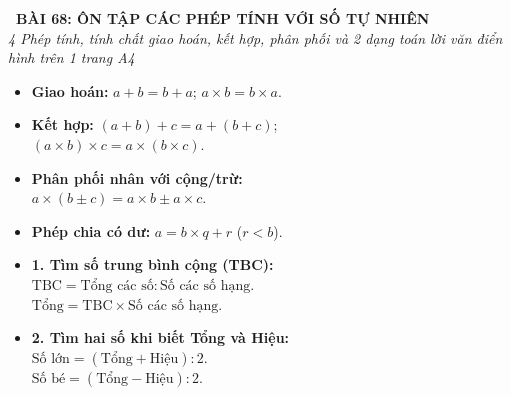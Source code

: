 \documentclass[14pt,a4paper,oneside]{extbook}
\begin{document}
\noindent
\begin{tcolorbox}[
  enhanced,
  colback=teal!8!white,
  colframe=teal!80!black,
  arc=3mm, boxrule=1pt,
  left=3mm, right=3mm, top=2mm, bottom=2mm,
  halign=center
]
  {\Large\bfseries\color{teal!90!black}\faBookmark\ BÀI 68: ÔN TẬP CÁC PHÉP TÍNH VỚI SỐ TỰ NHIÊN}\\[1.5pt]
  {\footnotesize\itshape\color{black!75} 4 Phép tính, tính chất giao hoán, kết hợp, phân phối và 2 dạng toán lời văn điển hình trên 1 trang A4}
\end{tcolorbox}

\vspace{-2.5mm}

\noindent
\begin{minipage}[t]{0.49\textwidth}\vspace{0pt}
\begin{tcolorbox}[
  enhanced,
  colback=blue!4!white,
  colframe=blue!75!black,
  arc=2mm, boxrule=0.8pt,
  left=2mm, right=2mm, top=1.8mm, bottom=1.8mm,
  title={\footnotesize\bfseries\color{white}\faCogs\ 1. Tính chất các phép tính}
]
{\footnotesize
\begin{itemize}\setlength{\itemsep}{1pt}\setlength{\leftskip}{-2.5mm}
  \item \textbf{Giao hoán:} $a + b = b + a$; \quad $a \times b = b \times a$.
  \item \textbf{Kết hợp:} $(a+b)+c = a+(b+c)$;\\
  $(a \times b) \times c = a \times (b \times c)$.
  \item \textbf{Phân phối nhân với cộng/trừ:}\\
  $a \times (b \pm c) = a \times b \pm a \times c$.
  \item \textbf{Phép chia có dư:} $a = b \times q + r$ ($r < b$).
\end{itemize}
}
\end{tcolorbox}
\end{minipage}
\hfill
\begin{minipage}[t]{0.49\textwidth}\vspace{0pt}
\begin{tcolorbox}[
  enhanced,
  colback=teal!4!white,
  colframe=teal!75!black,
  arc=2mm, boxrule=0.8pt,
  left=2mm, right=2mm, top=1.8mm, bottom=1.8mm,
  title={\footnotesize\bfseries\color{white}\faBook\ 2. Hai dạng toán lời văn kinh điển}
]
{\footnotesize
\begin{itemize}\setlength{\itemsep}{1.5pt}\setlength{\leftskip}{-2.5mm}
  \item \textbf{1. Tìm số trung bình cộng (TBC):}\\
  $\text{TBC} = \text{Tổng các số} : \text{Số các số hạng}$.\\
  $\text{Tổng} = \text{TBC} \times \text{Số các số hạng}$.
  \item \textbf{2. Tìm hai số khi biết Tổng và Hiệu:}\\
  $\text{Số lớn} = (\text{Tổng} + \text{Hiệu}) : 2$.\\
  $\text{Số bé} = (\text{Tổng} - \text{Hiệu}) : 2$.
\end{itemize}
}
\end{tcolorbox}
\end{minipage}
\end{document}
